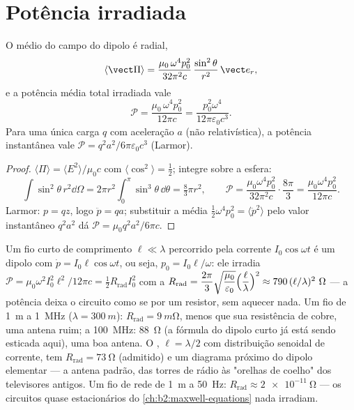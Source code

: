 \section{Potência irradiada}

\begin{proposition}\label{prop:b2:dipole-radiation:power}
O  médio do campo do dipolo é radial,
\[
\langle\vect\Pi\rangle = \frac{\mu_0\,\omega^4p_0^2}{32\pi^2c}\,\frac{\sin^2\theta}{r^2}\,\vect e_r ,
\]
e a potência média total irradiada vale
\[
\mathcal P = \frac{\mu_0\,\omega^4p_0^2}{12\pi c} = \frac{p_0^2\omega^4}{12\pi\varepsilon_0c^3} .
\]
Para uma única carga $q$ com aceleração $a$ (não relativística), a
potência instantânea vale $\mathcal P = q^2a^2/6\pi\varepsilon_0c^3$ (Larmor).
\end{proposition}

\begin{proof}
$\langle\Pi\rangle = \langle E^2\rangle/\mu_0c$ com $\langle\cos^2\rangle = \tfrac12$;
integre sobre a esfera:
\[
\int\sin^2\theta\,r^2\dd\Omega = 2\pi r^2\int_0^\pi\sin^3\theta\,\dd\theta = \tfrac83\pi r^2 ,
\qquad
\mathcal P = \frac{\mu_0\omega^4p_0^2}{32\pi^2c}\cdot\frac{8\pi}3 = \frac{\mu_0\omega^4p_0^2}{12\pi c} .
\]
Larmor: $p = qz$, logo $\ddot p = qa$;
substituir a média $\tfrac12\omega^4p_0^2 = \langle\ddot p^2\rangle$ pelo
valor instantâneo $q^2a^2$ dá $\mathcal P = \mu_0q^2a^2/6\pi c$.
\end{proof}

\begin{example}\label{ex:b2:dipole-radiation:antenna}
Um fio curto de comprimento $\ell \ll \lambda$ percorrido pela corrente $I_0\cos\omega t$ é um
dipolo com $\dot p = I_0\ell\cos\omega t$, ou seja, $p_0 = I_0\ell/\omega$: ele irradia
$\mathcal P = \mu_0\omega^2I_0^2\ell^2/12\pi c = \tfrac12R_{\text{rad}}I_0^2$ com a
\emph{} $R_{\text{rad}} = \dfrac{2\pi}3\sqrt{\dfrac{\mu_0}{\varepsilon_0}}
\Bigl(\dfrac\ell\lambda\Bigr)^2 \approx 790\,(\ell/\lambda)^2\ \Omega$ --- a potência deixa o
circuito como se por um resistor, sem aquecer nada. Um fio de \qty{1}{m}
a \qty{1}{MHz} ($\lambda = \qty{300}{m}$): $R_{\text{rad}} = \qty{9}{m\ohm}$, menos que
sua resistência de cobre, uma antena ruim; a \qty{100}{MHz}: \qty{88}{\ohm} (a
fórmula do dipolo curto já está sendo esticada aqui), uma boa antena. O \emph{}, $\ell = \lambda/2$ com distribuição senoidal de corrente, tem
$R_{\text{rad}} = \qty{73}{\ohm}$ (admitido) e um diagrama próximo do
dipolo elementar --- a antena padrão, das torres de rádio às
"orelhas de coelho" dos televisores antigos. Um fio de rede de \qty{1}{m} a \qty{50}{Hz}:
$R_{\text{rad}} \approx \qty{2e-11}{\ohm}$ --- os circuitos quase estacionários do
\cref{ch:b2:maxwell-equations} nada irradiam.
\end{example}

